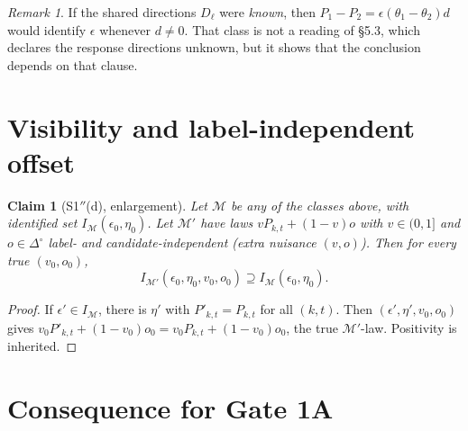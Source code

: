 \documentclass[11pt,a4paper]{article}
\theoremstyle{plain}
\newtheorem{claim}{Claim}
\theoremstyle{definition}
\theoremstyle{remark}
\newtheorem*{remark}{Remark}
\newcommand{\eps}{\epsilon}
\newcommand{\simp}{\Delta^{\circ}}
\begin{document}
\begin{remark}
If the shared directions $D_\ell$ were \emph{known}, then
$P_1-P_2=\eps(\theta_1-\theta_2)d$ would identify $\eps$ whenever $d\neq0$. That class is not
a reading of \S5.3, which declares the response directions unknown, but it shows that the
conclusion depends on that clause.
\end{remark}

\section{Visibility and label-independent offset}

\begin{claim}[S1$''$(d), enlargement]\label{c:d}
Let $\mathcal M$ be any of the classes above, with identified set $I_{\mathcal M}(\eps_0,\eta_0)$.
Let $\mathcal M'$ have laws $vP_{k,t}+(1-v)o$ with $v\in(0,1]$ and $o\in\simp$
label- and candidate-independent (extra nuisance $(v,o)$). Then for every true $(v_0,o_0)$,
\[
I_{\mathcal M'}(\eps_0,\eta_0,v_0,o_0)\supseteq I_{\mathcal M}(\eps_0,\eta_0).
\]
\end{claim}
\begin{proof}
If $\eps'\in I_{\mathcal M}$, there is $\eta'$ with $P'_{k,t}=P_{k,t}$ for all $(k,t)$. Then
$(\eps',\eta',v_0,o_0)$ gives $v_0P'_{k,t}+(1-v_0)o_0=v_0P_{k,t}+(1-v_0)o_0$, the true
$\mathcal M'$-law. Positivity is inherited.
\end{proof}

\section{Consequence for Gate 1A}
\end{document}
